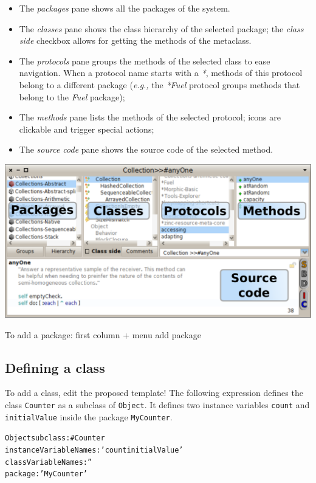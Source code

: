 \documentclass[notumble]{leaflet}
\makeatletter
\newcommand{\eg}{\emph{e.g.,}\xspace}
\newenvironment{displaycode}{%
     \par
     \hspace{1.5em}\begin{minipage}{\linewidth}
       \begin{alltt}\small}{
       \end{alltt}
     \end{minipage}
     \par}
\newcommand{\code}[1]{\foreignlanguage{english}{\texttt{#1}}}
\makeatother
\begin{document}
\begin{itemize}
\item The \emph{packages} pane shows all the packages of the system.
\item The \emph{classes} pane shows the class hierarchy of the
  selected package; the \emph{class side} checkbox allows for getting
  the methods of the metaclass.
\item The \emph{protocols} pane groups the methods of the selected
  class to ease navigation.  When a protocol name starts with a \emph{*}, methods of this
  protocol belong to a different package (\eg the \emph{*Fuel}
  protocol groups methods that belong to the \emph{Fuel} package);
\item The \emph{methods} pane lists the methods of the selected
  protocol; icons are clickable and trigger special actions;
\item The \emph{source code} pane shows the source code of the
  selected method. 
\end{itemize}

\begin{center}
  \includegraphics[width=\textwidth]{nautilus-anotated}
\end{center}

To add a package: first column + menu add package

\subsection{Defining a class}
To add a class, edit the proposed template!
The following expression defines the class \code{Counter} as a subclass of \code{Object}.
It defines two instance variables \code{count} and \code{initialValue} inside the package \code{MyCounter}.

\begin{displaycode}
Object subclass: #Counter
   instanceVariableNames: 'count initialValue'
   classVariableNames: '' 
   package: 'MyCounter'
\end{displaycode}
\end{document}
